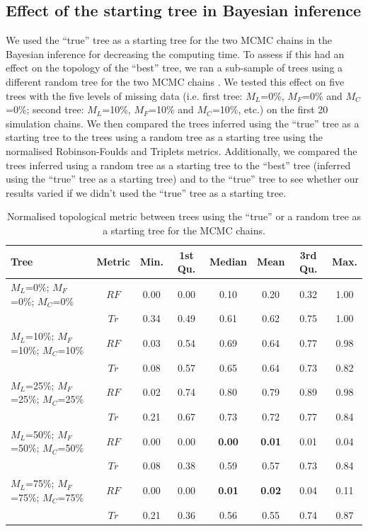 \documentclass[12pt,letterpaper]{article}
\begin{document}
\subsection{Effect of the starting tree in Bayesian inference}
We used the ``true'' tree as a starting tree for the two MCMC chains in the Bayesian inference for decreasing the computing time.
To assess if this had an effect on the topology of the ``best'' tree, we ran a sub-sample of trees using a different random tree for the two MCMC chains \citep[default MrBayes option;][]{Ronquist2012mrbayes}.
We tested this effect on five trees with the five levels of missing data (i.e. first tree: $M_L$=0\%, $M_F$=0\% and $M_C$=0\%; second tree: $M_L$=10\%, $M_F$=10\% and $M_C$=10\%, etc.) on the first 20 simulation chains.
We then compared the trees inferred using the ``true'' tree as a starting tree to the trees using a random tree as a starting tree using the normalised Robinson-Foulds and Triplets metrics.
Additionally, we compared the trees inferred using a random tree as a starting tree to the ``best'' tree (inferred using the ``true'' tree as a starting tree) and to the ``true'' tree to see whether our results varied if we didn't used the ``true'' tree as a starting tree.

\begin{table}[!ht]
\caption{Normalised topological metric between trees using the ``true'' or a random tree as a starting tree for the MCMC chains.}
\centering
\begin{tabular}{|l|c|c|c|c|c|c|c|}
  \hline
 Tree &  Metric & Min. & 1st Qu. & Median & Mean & 3rd Qu. & Max. \\ 
  \hline
    $M_L$=0\%; $M_F$=0\%; $M_C$=0\%          & $RF$ & 0.00 & 0.00 & 0.10 & 0.20 & 0.32 & 1.00 \\ 
                                             & $Tr$ & 0.34 & 0.49 & 0.61 & 0.62 & 0.75 & 1.00 \\ 
    $M_L$=10\%; $M_F$=10\%; $M_C$=10\%       & $RF$ & 0.03 & 0.54 & 0.69 & 0.64 & 0.77 & 0.98 \\ 
                                             & $Tr$ & 0.08 & 0.57 & 0.65 & 0.64 & 0.73 & 0.82 \\ 
    $M_L$=25\%; $M_F$=25\%; $M_C$=25\%       & $RF$ & 0.02 & 0.74 & 0.80 & 0.79 & 0.89 & 0.98 \\ 
                                             & $Tr$ & 0.21 & 0.67 & 0.73 & 0.72 & 0.77 & 0.84 \\ 
    $M_L$=50\%; $M_F$=50\%; $M_C$=50\%       & $RF$ & 0.00 & 0.00 & \textbf{0.00} & \textbf{0.01} & 0.01 & 0.04 \\ 
                                             & $Tr$ & 0.08 & 0.38 & 0.59 & 0.57 & 0.73 & 0.84 \\ 
    $M_L$=75\%; $M_F$=75\%; $M_C$=75\%       & $RF$ & 0.00 & 0.00 & \textbf{0.01} & \textbf{0.02} & 0.04 & 0.11 \\ 
                                             & $Tr$ & 0.21 & 0.36 & 0.56 & 0.55 & 0.74 & 0.87 \\ 
   \hline
\end{tabular}
\label{Tab_Results-Difference_methods}
\end{table}
\end{document}
